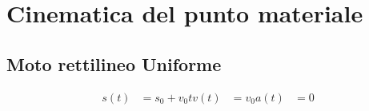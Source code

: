 \documentclass[../../dimostrazioni]{subfiles}
\begin{document}
    \chapter{Cinematica del punto materiale}

        \section*{Moto rettilineo Uniforme}
        
            \begin{align}
                s(t) &= s_0 + v_0 t
                v(t) &= v_0
                a(t) &= 0
            \end{align}    

        
\end{document}
